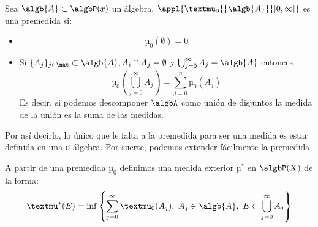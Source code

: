 \documentclass{apuntes}
\begin{document}
\begin{defn}[Premedida]
Sea $\algb{A} \subset \algbP(x)$ un álgebra, $\appl{µ_0}{\algb{A}}{[0, \infty]}$ es una premedida si:
\begin{itemize}
\item
\[µ_0(\emptyset)=0\]
\item Si $\{A_j\}_{j \in \nat} \subset \algb{A}, A_i \cap A_j = \emptyset$ y $\bigcup_{j=0}^{\infty}A_j = \algb{A}$ entonces
\[µ_0(\bigcup_{j=0}^{\infty}A_j) = \sum_{j=0}^{n}µ_0(A_j)\]
Es decir, si podemos descomponer $\algbA$ como unión de disjuntos la medida de la unión es la suma de las medidas.
\end{itemize}
\end{defn}

Por así decirlo, lo único que le falta a la premedida para ser una medida es estar definida en una σ-álgebra. Por suerte, podemos extender fácilmente la premedida.

A partir de una premedida $µ_0$ definimos una medida exterior $µ^*$ en $\algbP(X)$ de la forma:
\[µ^*(E) = \inf \left\{\sum_{j=0}^{\infty} µ_0(A_j), \ A_j \in \algb{A}, \ E \subset \bigcup_{j=0}^{\infty}A_j\right\}\]
\end{document}
